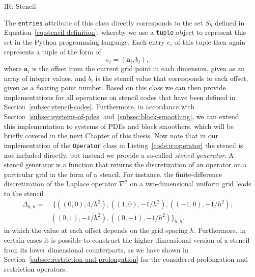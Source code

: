 \begin{listing}
	\inputminted{python}{evostencils/ir/stencil.py}
	\caption{IR: Stencil}
	\label{code:ir:stencil}
\end{listing}
The \texttt{entries} attribute of this class directly corresponds to the set $S_h$ defined in Equation~\ref{eq:stencil-definition}, whereby we use a \texttt{tuple} object to represent this set in the Python programming language.
Each entry $e_i$ of this tuple then again represents a tuple of the form of
\begin{equation}
	e_i = \left(\bm{a}_i, b_i \right),
\end{equation} 
where $\bm{a}_i$ is the offset from the current grid point in each dimension, given as an array of integer values, and $b_i$ is the stencil value that corresponds to each offset, given as a floating point number.
Based on this class we can then provide implementations for all operations on stencil codes that have been defined in Section~\ref{subsec:stencil-codes}.
Furthermore, in accordance with Section~\ref{subsec:systems-of-pdes} and~\ref{subsec:block-smoothing}, we can extend this implementation to systems of PDEs and block smoothers, which will be briefly covered in the next Chapter of this thesis. %
Now note that in our implementation of the \texttt{Operator} class in Listing~\ref{code:ir:operator} the stencil is not included directly, but instead we provide a so-called \emph{stencil generator}.
A stencil generator is a function that returns the discretization of an operator on a particular grid in the form of a stencil.
For instance, the finite-difference discretization of the Laplace operator $\nabla^2$ on a two-dimensional uniform grid leads to the stencil 
\begin{equation*}
	\begin{split}
		\Delta_{h,h} = & \; \big\{ \left( \left( 0,0 \right), 4 / h^2 \right), \left(\left(1,0\right), -1/h^2\right), \left(\left(-1,0\right), -1 / h^2\right), \\ & \left(\left(0,1\right), -1/h^2\right), \left(\left(0,-1\right), -1/h^2\right) \big\}_{h,h}.
	\end{split}
\end{equation*}
in which the value at each offset depends on the grid spacing $h$.
Furthermore, in certain cases it is possible to construct the higher-dimensional version of a stencil from its lower dimensional counterparts, as we have shown in Section~\ref{subsec:restriction-and-prolongation} for the considered prolongation and restriction operators.

